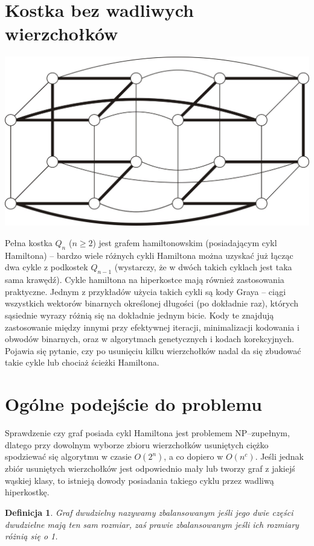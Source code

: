 \documentclass{pracamgr}
\newtheorem{defi}[theorem]{Definicja}
\begin{document}
  \section{Kostka bez wadliwych wierzchołków}
   \begin{center}
    \includegraphics[scale=0.5]{img/Q4_hamilton.jpg}
   \end{center}
   Pełna kostka $Q_n$ ($n\ge2$) jest grafem hamiltonowskim (posiadającym cykl Hamiltona)
   -- bardzo wiele różnych cykli Hamiltona można uzyskać już łącząc dwa cykle
   z podkostek $Q_{n-1}$ (wystarczy, że w dwóch takich cyklach jest taka sama krawędź).
   Cykle hamiltona na hiperkostce mają również zastosowania praktyczne. Jednym z przykładów użycia takich cykli są kody Graya
   -- ciągi wszystkich wektorów binarnych określonej długości (po dokładnie raz), których sąsiednie wyrazy różnią się na dokładnie jednym bicie.
   Kody te znajdują zastosowanie między innymi przy efektywnej iteracji, minimalizacji kodowania i obwodów binarnych,
   oraz w algorytmach genetycznych i kodach korekcyjnych.\newline
   Pojawia się pytanie, czy po usunięciu kilku wierzchołków nadal da się zbudować takie cykle lub chociaż ścieżki Hamiltona.
  \section{Ogólne podejście do problemu}
   Sprawdzenie czy graf posiada cykl Hamiltona jest problemem NP--zupełnym, dlatego przy dowolnym wyborze zbioru wierzchołków usuniętych
   ciężko spodziewać się algorytmu w czasie $O(2^n)$, a co dopiero w $O(n^c)$. Jeśli jednak zbiór usuniętych wierzchołków
   jest odpowiednio mały lub tworzy graf z jakiejś wąskiej klasy, to istnieją dowody posiadania takiego cyklu przez wadliwą hiperkostkę.
   \begin{defi}\label{graf zbalansowany}
    Graf dwudzielny nazywamy \emph{zbalansowanym} jeśli jego dwie części dwudzielne mają ten sam rozmiar,
    zaś \emph{prawie zbalansowanym} jeśli ich rozmiary różnią się o 1.
   \end{defi}    
   
\end{document}
